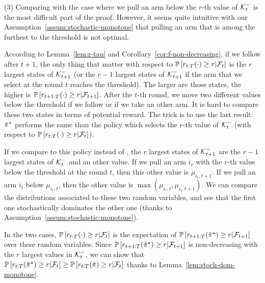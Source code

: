 (3) Comparing \FLUT with the case where we pull an arm below the $r$-th value of $\mathcal{K}_t^-$ is the most difficult part of the proof. However, it seems quite intuitive with our Assumption~\ref{assum:stochastic-monotone} that pulling an arm that is among the furthest to the threshold is not optimal.

According to Lemma~\ref{lem:r-tau} and Corollary~\ref{cor:f-non-decreasing}, if we follow \FLUT after $t+1$, the only thing that matter with respect to $\mathbb{P}\left[r_{t:T}(\cdot) \geq r| \mathcal{F}_t\right]$ is the $r$ largest states of $\mathcal{K}^-_{t+1}$ (or the $r-1$ largest states of $\mathcal{K}^-_{t+1}$ if the arm that we select at the round $t$ reaches the threshold). The larger are those states, the higher is $\mathbb{P}\left[r_{t+1:T}(\cdot) \geq r| \mathcal{F}_{t+1}\right]$. After the $t$-th round, we move two different values below the threshold if we follow \FLUT or if we take an other arm. It is hard to compare these two states in terms of potential reward. The trick is to use the last result: $\Tilde{\pi}^\star$ performs the same than the policy which selects the $r$-th value of $\mathcal{K}_t^-$ (with respect to $\mathbb{P}\left[r_{t:T}(\cdot) \geq r| \mathcal{F}_t\right]$).  

If we compare to this policy instead of \FLUT, the $r$ largest states of $\mathcal{K}^-_{t+1}$ are the $r-1$ largest states of $\mathcal{K}_t^-$ and an other value. If we pull an arm $i_r$ with the $r$-th value below the threshold at the round $t$, then this other value is $\mu_{i_r,t+1}$. If we pull an arm $i_t$ below $\mu_{i_r,t}$,  then the other value is $\max(\mu_{i_r,t}, \mu_{i_t, t+1})$. We can compare the distributions associated to these two random variables, and see that the first one stochastically dominates the other one (thanks to Assumption~\ref{assum:stochastic-monotone}). 

In the two cases, $\mathbb{P}\left[r_{t:T}(\cdot) \geq r| \mathcal{F}_t\right]$ is the expectation of $\mathbb{P}\left[r_{t+1:T}(\Tilde{\pi}^\star) \geq r| \mathcal{F}_{t+1}\right]$ over these random variables. Since $\mathbb{P}\left[r_{t+1:T}(\Tilde{\pi}^\star) \geq r| \mathcal{F}_{t+1}\right]$ is non-decreasing with the $r$ largest values in $\mathcal{K}_t^-$, we can show that $\mathbb{P}\left[r_{t:T}(\Tilde{\pi}^\star) \geq r| \mathcal{F}_t\right] \geq \mathbb{P}\left[r_{t:T}(\Tilde{\pi}) \geq r| \mathcal{F}_t\right]$ thanks to Lemma~\ref{lem:stoch-dom-monotone}. 

